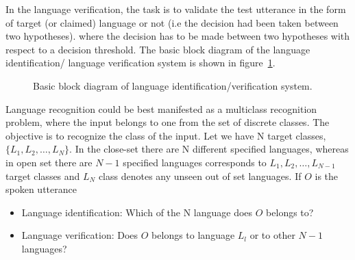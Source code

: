 \begin{spacing}{1.5}
In the language verification, the task is to validate the test utterance in the form of target (or claimed) language or not (i.e the decision had been taken between two hypotheses). where the decision has to be made between two hypotheses with respect to a decision threshold. The basic block diagram of the language identification/ language verification system is shown in figure~\ref{lr}. 
 \begin{figure}[h]
\caption{Basic block diagram of language identification/verification system.}
\label{lr}
\end{figure} 
  
  Language recognition could be best manifested as a multiclass recognition problem, where the input belongs to one from the set of discrete classes. The objective is to recognize the class of the input. Let we have N target classes, $\{L_{1},L_{2},\ldots,L_{N}\}$. In the close-set there are N different specified languages, whereas in open set there are $N-1$ specified languages corresponds to $L_{1}, L_{2},\ldots, L_{N-1}$ target classes and  $L_{N}$ class denotes any unseen out of set languages. If $O$ is the spoken utterance
\begin{itemize}
    \item Language identification: Which of the N language does $O$ belongs to?
    \item Language verification: Does $O$ belongs to language $L_{l}$ or to other $N-1$ languages? 
\end{itemize}





\end{spacing}

